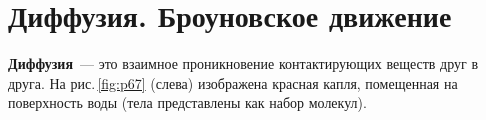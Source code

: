 \documentclass[main.tex]{subfiles}
\begin{document}



\pagestyle{empty}

 

\setcounter{section}{39
}
\addtocounter{section}{-1} 

\section{Диффузия. Броуновское движение}


\textbf{Диффузия}~--- это взаимное проникновение контактирующих веществ друг в друга. На рис.\,\ref{fig:p67} (слева) изображена красная капля, помещенная на поверхность воды (тела представлены как набор молекул). 
\end{document}
